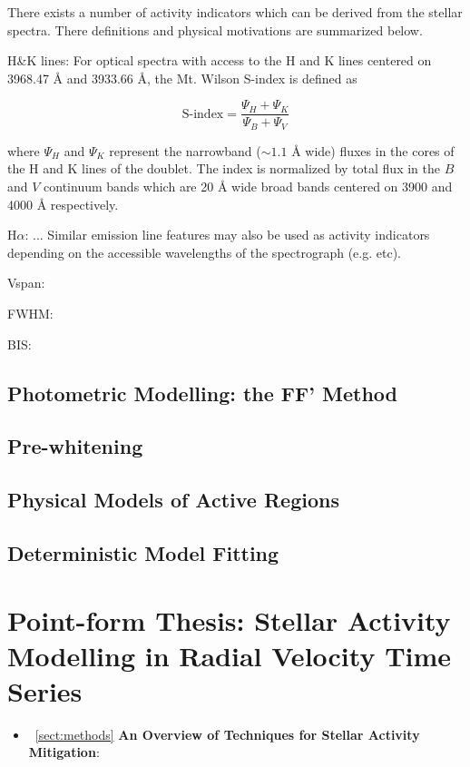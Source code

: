 There exists a number of activity indicators which can be derived from the stellar
spectra. There definitions and physical motivations are summarized below.

\caii{} H\&K lines: 
For optical spectra with access to the \caii{} H and K lines
centered on 3968.47 \AA{} and 3933.66 \AA{,} the Mt. Wilson S-index is defined as

\begin{equation}
  \text{S-index} = \frac{\Psi_H + \Psi_K}{\Psi_B + \Psi_V}
\end{equation}

\noindent where $\Psi_H$ and $\Psi_K$ represent the narrowband
($\sim 1.1$ \AA{} wide) fluxes in the cores of the H and K lines of the \caii{}
doublet. The index is normalized by total flux in the $B$ and $V$ continuum bands
which are 20 \AA{} wide broad bands centered on 3900 and 4000 \AA{} respectively.

H$\alpha$: ...
Similar emission line features may also be used as activity indicators depending
on the accessible wavelengths of the spectrograph (e.g. \hei{,} \nai{,} etc).

Vspan:
\citep{queloz01}

FWHM:

BIS:


\citep{boisse09,boisse11}

\subsection{Photometric Modelling: the FF' Method }
\citep{aigrain12}

\subsection{Pre-whitening}
\citep{queloz09}

\subsection{Physical Models of Active Regions}
\citep{dumusque14}

\subsection{Deterministic Model Fitting}
\citep{sarkis18}


\section{Point-form Thesis: Stellar Activity Modelling in Radial Velocity
  Time Series}
\begin{itemize}
\renewcommand\labelitemi{--}
\item~\ref{sect:methods} \textbf{An Overview of Techniques for Stellar Activity
Mitigation}:
\end{itemize}
